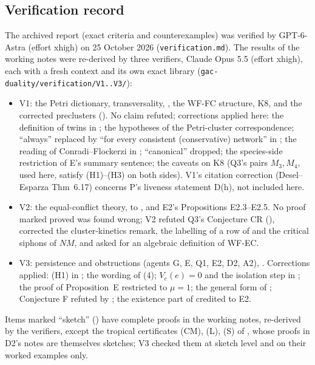 \documentclass[11pt,a4paper]{report}
\begin{document}
\subsection{Verification record}

The archived report (exact criteria and counterexamples) was verified by GPT-6-Astra (effort xhigh) on 25 October 2026
(\texttt{verification.md}). The results of the working notes were re-derived by three verifiers, Claude Opus 5.5 (effort xhigh), each with
a fresh context and its own exact library (\texttt{gac-duality/verification/V1..V3/}):
\begin{itemize}
\item V1: the Petri dictionary, transversality, , the WF-FC structure, K8, and the corrected preclusters
(). No claim refuted; corrections applied here: the definition of twins in ; the
hypotheses of the Petri-cluster correspondence; ``always'' replaced by ``for every consistent (conservative) network'' in
; the reading of Conradi--Flockerzi in ; ``canonical'' dropped; the species-side
restriction of E's summary sentence; the caveats on K8 (Q3's pairs \(M_3,M_4\), used here, satisfy (H1)--(H3) on
both sides). V1's citation correction (Desel--Esparza Thm~6.17) concerns P's liveness statement D(h), not included here.
\item V2: the equal-conflict theory,  to , and E2's Propositions E2.3--E2.5. No proof marked
proved was found wrong; V2 refuted Q3's Conjecture CR (), corrected the cluster-kinetics remark, the
labelling of a row of  and the critical siphons of \(NM\), and asked for an algebraic definition of WF-EC.
\item V3: persistence and obstructions (agents G, E, Q1, E2, D2, A2), .
Corrections applied: (H1) in ; the wording of (4); \(V_e(e)=0\) and the isolation step in
; the proof of Proposition~E restricted to \(\mu=1\); the general form of ; Conjecture F refuted
by ; the existence part of  credited to E2.
\end{itemize}
Items marked ``sketch'' () have complete proofs in the
working notes, re-derived by the verifiers, except the tropical certificates (CM), (L), (S) of ,
whose proofs in D2's notes are themselves sketches; V3 checked them at sketch level and on their worked examples only.
\end{document}
